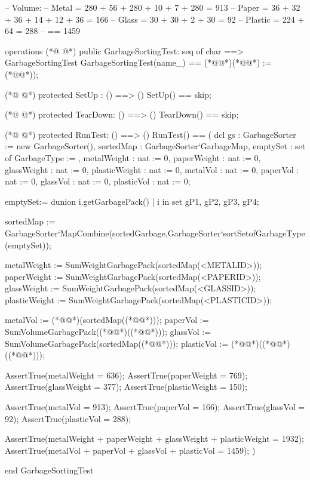 \begin{vdmpp}[breaklines=true]
-- Volume:
-- Metal = 280 + 56 + 280 + 10 + 7 + 280 = 913
-- Paper = 36 + 32 + 36 + 14 + 12 + 36 = 166
-- Glass = 30 + 30 + 2 + 30 = 92
-- Plastic = 224 + 64 = 288
-- == 1459

operations
(*@
\label{GarbageSortingTest:52}
@*)
    public GarbageSortingTest: seq of char ==> GarbageSortingTest
    GarbageSortingTest(name_) ==
    (*@\vdmnotcovered{(}@*)(*@@*) := (*@@*));

(*@
\label{SetUp:56}
@*)
    protected SetUp : () ==> ()
    SetUp() == skip;

(*@
\label{TearDown:59}
@*)
    protected TearDown: () ==> ()
    TearDown() == skip;

(*@
\label{RunTest:62}
@*)
    protected RunTest: () ==> ()
    RunTest() ==
    (
        dcl gs : GarbageSorter := new GarbageSorter(), 
                sortedMap : GarbageSorter`GarbageMap, 
                emptySet : set of GarbageType := {},
                metalWeight : nat := 0,
                paperWeight : nat := 0,
                glassWeight : nat := 0,
                plasticWeight : nat := 0,
                metalVol : nat := 0,
                paperVol : nat := 0,
                glassVol : nat := 0,
                plasticVol : nat := 0;

        emptySet:= dunion {i.getGarbagePack() | i in set {gP1, gP2, gP3, gP4}};

        sortedMap := GarbageSorter`MapCombine(sortedGarbage,GarbageSorter`sortSetofGarbageType(emptySet));

        metalWeight := SumWeightGarbagePack(sortedMap(<METALID>));
        paperWeight := SumWeightGarbagePack(sortedMap(<PAPERID>));
        glassWeight := SumWeightGarbagePack(sortedMap(<GLASSID>));
        plasticWeight := SumWeightGarbagePack(sortedMap(<PLASTICID>));

        metalVol := (*@@*)(sortedMap((*@@*)));
        paperVol := SumVolumeGarbagePack((*@@*)((*@@*)));
        glassVol := SumVolumeGarbagePack(sortedMap((*@@*)));
        plasticVol := (*@@*)((*@@*)((*@@*)));

        AssertTrue(metalWeight = 636);
        AssertTrue(paperWeight = 769);
        AssertTrue(glassWeight = 377);
        AssertTrue(plasticWeight = 150);

        AssertTrue(metalVol = 913);
        AssertTrue(paperVol = 166);
        AssertTrue(glassVol = 92);
        AssertTrue(plasticVol = 288);

        AssertTrue(metalWeight + paperWeight + glassWeight + plasticWeight = 1932);
        AssertTrue(metalVol + paperVol + glassVol + plasticVol = 1459);
    )

end GarbageSortingTest
\end{vdmpp}
